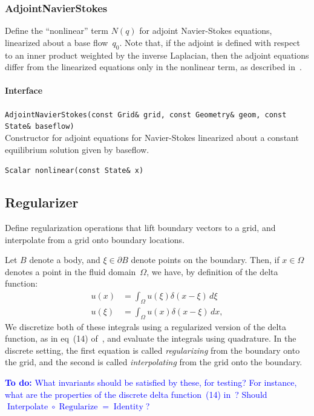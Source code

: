 \documentclass[11pt]{article}
\def\todo#1{\textcolor{blue}{{\bf To do:} #1}}
\let\code\lstinline
\begin{document}
\subsubsection{AdjointNavierStokes}
Define the ``nonlinear'' term $N(q)$ for adjoint Navier-Stokes equations, linearized about a base flow~$q_0$.  Note that, if the adjoint is defined with respect to an inner product weighted by the inverse Laplacian, then the adjoint equations differ from the linearized equations only in the nonlinear term, as described in~\cite{AhuRow-08}.

\paragraph{Interface}
\begin{description}
	\item \code|AdjointNavierStokes(const Grid& grid, const Geometry& geom, const State& baseflow)|\\
		Constructor for adjoint equations for Navier-Stokes linearized about a constant equilibrium solution given by baseflow.
	\item \code|Scalar nonlinear(const State& x)|
\end{description}

\subsection{Regularizer}
Define regularization operations that lift boundary vectors to a grid, and interpolate from a grid onto boundary locations.

Let $B$ denote a body, and $\xi\in\partial B$ denote points on the boundary.  Then, if $x\in\Omega$ denotes a point in the fluid domain~$\Omega$, we have, by definition of the delta function:
\begin{align}
	u(x) &= \int_\Omega u(\xi) \delta(x-\xi)\,d\xi\\
	u(\xi) &= \int_\Omega u(x) \delta(x-\xi)\,dx,
\end{align}
We discretize both of these integrals using a regularized version of the delta function, as in eq~(14) of~\cite{TaiCol-06}, and evaluate the integrals using quadrature.  In the discrete setting, the first equation is called {\em regularizing} from the boundary onto the grid, and the second is called {\em interpolating} from the grid onto the boundary.

\todo{What invariants should be satisfied by these, for testing?  For instance, what are the properties of the discrete delta function~(14) in~\cite{TaiCol-06}?  Should $\operatorname{Interpolate}\circ\operatorname{Regularize} = \operatorname{Identity}$?}
\end{document}
